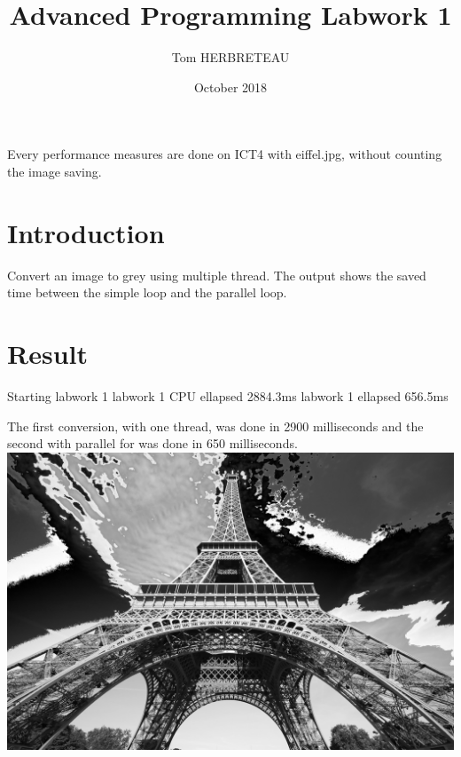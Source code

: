 \documentclass{article}
\title{Advanced Programming Labwork 1}
\author{Tom HERBRETEAU }
\date{October 2018}
\begin{document}
\maketitle
Every performance measures are done on ICT4 with eiffel.jpg, without counting the image saving.
\section{Introduction}
Convert an image to grey using multiple thread. The output shows the saved time between the simple loop and the parallel loop.

\section{Result}

\newline Starting labwork 1
\newline labwork 1 CPU ellapsed 2884.3ms
\newline labwork 1 ellapsed 656.5ms

The first conversion, with one thread, was done in 2900 milliseconds and the second with parallel for was done in 650 milliseconds.
\newline
\includegraphics[width=\textwidth]{labwork2-openmp-out.jpg}

\end{document}
